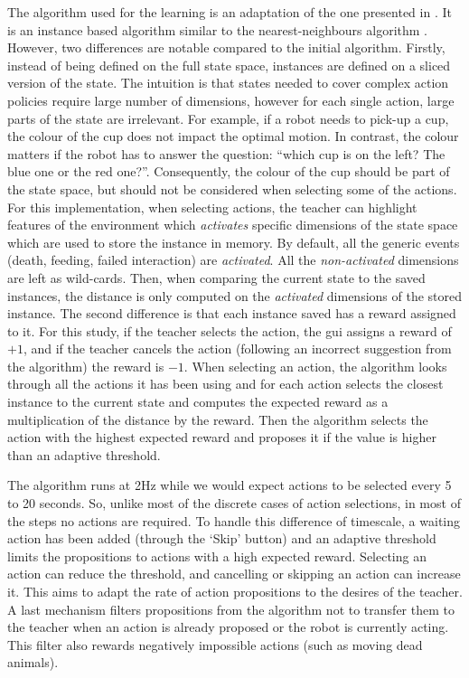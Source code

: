 The algorithm used for the learning is an adaptation of the one presented in \cite{senft2017toward}. It is an instance based algorithm similar to the nearest-neighbours algorithm \citep{cover1967nearest}. However, two differences are notable compared to the initial algorithm. %
Firstly, instead of being defined on the full state space, instances are defined on a sliced version of the state. The intuition is that states needed to cover complex action policies require large number of dimensions, however for each single action, large parts of the state are irrelevant. For example, if a robot needs to pick-up a cup, the colour of the cup does not impact the optimal motion. In contrast, the colour matters if the robot has to answer the question: ``which cup is on the left? The blue one or the red one?''. Consequently, the colour of the cup should be part of the state space, but should not be considered when selecting some of the actions. For this implementation, when selecting actions, the teacher can highlight features of the environment which \emph{activates} specific dimensions of the state space which are used to store the instance in memory. By default, all the generic events (death, feeding, failed interaction) are \emph{activated}. All the \emph{non-activated} dimensions are left as wild-cards. Then, when comparing the current state to the saved instances, the distance is only computed on the \emph{activated} dimensions of the stored instance. The second difference is that each instance saved has a reward assigned to it. For this study, if the teacher selects the action, the \gls{gui} assigns a reward of $+1$, and if the teacher cancels the action (following an incorrect suggestion from the algorithm) the reward is $-1$. When selecting an action, the algorithm looks through all the actions it has been using and for each action selects the closest instance to the current state and computes the expected reward as a multiplication of the distance by the reward. Then the algorithm selects the action with the highest expected reward and proposes it if the value is higher than an adaptive threshold. 

The algorithm runs at 2Hz while we would expect actions to be selected every 5 to 20 seconds. So, unlike most of the discrete cases of action selections, in most of the steps no actions are required. To handle this difference of timescale, a waiting action has been added (through the `Skip' button) and an adaptive threshold limits the propositions to actions with a high expected reward. Selecting an action can reduce the threshold, and cancelling or skipping an action can increase it. This aims to adapt the rate of action propositions to the desires of the teacher. A last mechanism filters propositions from the algorithm not to transfer them to the teacher when an action is already proposed or the robot is currently acting. This filter also rewards negatively impossible actions (such as moving dead animals).


